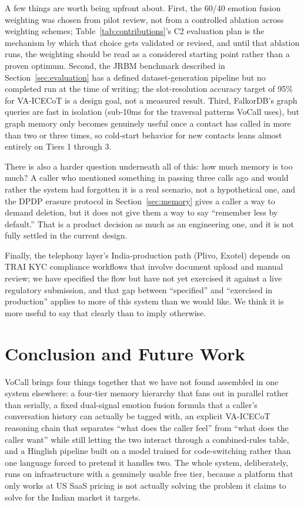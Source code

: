 \documentclass[conference]{IEEEtran}
\begin{document}
A few things are worth being upfront about. First, the 60/40 emotion fusion weighting was chosen from pilot review, not from a controlled ablation across weighting schemes; Table~\ref{tab:contributions}'s C2 evaluation plan is the mechanism by which that choice gets validated or revised, and until that ablation runs, the weighting should be read as a considered starting point rather than a proven optimum. Second, the JRBM benchmark described in Section~\ref{sec:evaluation} has a defined dataset-generation pipeline but no completed run at the time of writing; the slot-resolution accuracy target of 95\% for VA-ICECoT is a design goal, not a measured result. Third, FalkorDB's graph queries are fast in isolation (sub-10ms for the traversal patterns VoCall uses), but graph memory only becomes genuinely useful once a contact has called in more than two or three times, so cold-start behavior for new contacts leans almost entirely on Tiers 1 through 3.

There is also a harder question underneath all of this: how much memory is too much? A caller who mentioned something in passing three calls ago and would rather the system had forgotten it is a real scenario, not a hypothetical one, and the DPDP erasure protocol in Section~\ref{sec:memory} gives a caller a way to demand deletion, but it does not give them a way to say ``remember less by default.'' That is a product decision as much as an engineering one, and it is not fully settled in the current design.

Finally, the telephony layer's India-production path (Plivo, Exotel) depends on TRAI KYC compliance workflows that involve document upload and manual review; we have specified the flow but have not yet exercised it against a live regulatory submission, and that gap between ``specified'' and ``exercised in production'' applies to more of this system than we would like. We think it is more useful to say that clearly than to imply otherwise.

\section{Conclusion and Future Work}
\label{sec:conclusion}

VoCall brings four things together that we have not found assembled in one system elsewhere: a four-tier memory hierarchy that fans out in parallel rather than serially, a fixed dual-signal emotion fusion formula that a caller's conversation history can actually be tagged with, an explicit VA-ICECoT reasoning chain that separates ``what does the caller feel'' from ``what does the caller want'' while still letting the two interact through a combined-rules table, and a Hinglish pipeline built on a model trained for code-switching rather than one language forced to pretend it handles two. The whole system, deliberately, runs on infrastructure with a genuinely usable free tier, because a platform that only works at US SaaS pricing is not actually solving the problem it claims to solve for the Indian market it targets.
\end{document}
